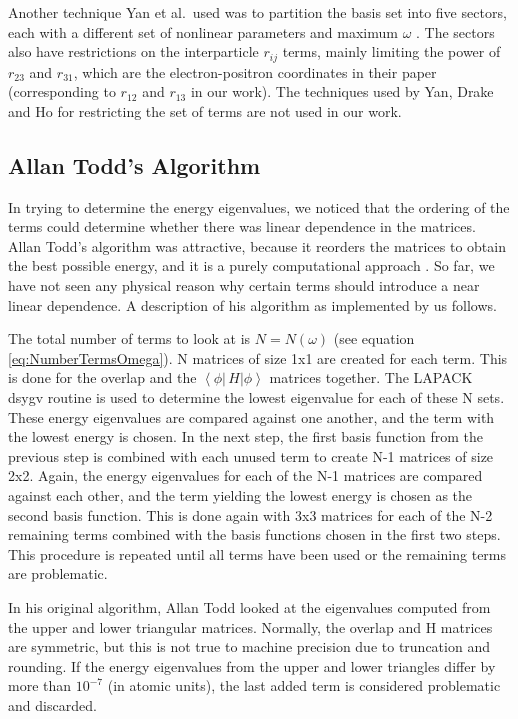 \documentclass[Dissertation.tex]{subfiles}
\begin{document}
Another technique Yan et al.\ used was to partition the basis set into five sectors, each with a different set of nonlinear parameters and maximum $\omega$ \cite{Yan1999}. The sectors also have restrictions on the interparticle $r_{ij}$ terms, mainly limiting the power of $r_{23}$ and $r_{31}$, which are the electron-positron coordinates in their paper (corresponding to $r_{12}$ and $r_{13}$ in our work). The techniques used by Yan, Drake and Ho for restricting the set of terms are not used in our work.


\subsection{Allan Todd's Algorithm}
\label{sec:ToddBound}
In trying to determine the energy eigenvalues, we noticed that the ordering of the terms could determine whether there was linear dependence in the matrices. Allan Todd's algorithm was attractive, because it reorders the matrices to obtain the best possible energy, and it is a purely computational approach \cite{Todd2007}. So far, we have not seen any physical reason why certain terms should introduce a near linear dependence. A description of his algorithm as implemented by us follows.

The total number of terms to look at is $N = N(\omega)$ (see equation \ref{eq:NumberTermsOmega}). N matrices of size 1x1 are created for each term. This is done for the overlap and the $\left\langle \phi \left| \,H \right| \phi \right\rangle$ matrices together. The LAPACK dsygv routine is used to determine the lowest eigenvalue for each of these N sets. These energy eigenvalues are compared against one another, and the term with the lowest energy is chosen. In the next step, the first basis function from the previous step is combined with each unused term to create N-1 matrices of size 2x2. Again, the energy eigenvalues for each of the N-1 matrices are compared against each other, and the term yielding the lowest energy is chosen as the second basis function. This is done again with 3x3 matrices for each of the N-2 remaining terms combined with the basis functions chosen in the first two steps. This procedure is repeated until all terms have been used or the remaining terms are problematic.

In his original algorithm, Allan Todd looked at the eigenvalues computed from the upper and lower triangular matrices. Normally, the overlap and H matrices are symmetric, but this is not true to machine precision due to truncation and rounding. If the energy eigenvalues from the upper and lower triangles differ by more than $10^{-7}$ (in atomic units), the last added term is considered problematic and discarded.
\end{document}
